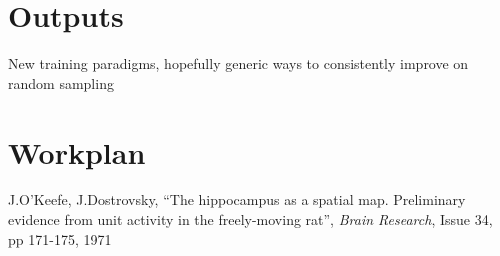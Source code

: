 \documentclass[a4paper,11pt]{article}
\begin{document}
\section{Outputs}
New training paradigms, hopefully generic ways to consistently improve on random sampling

\section{Workplan}


\begin{thebibliography}{1}
J.O'Keefe, J.Dostrovsky, ``The hippocampus as a spatial map. Preliminary evidence from unit activity in the freely-moving rat'', \textit{Brain Research}, Issue 34, pp 171-175, 1971
\end{thebibliography}
\end{document}
